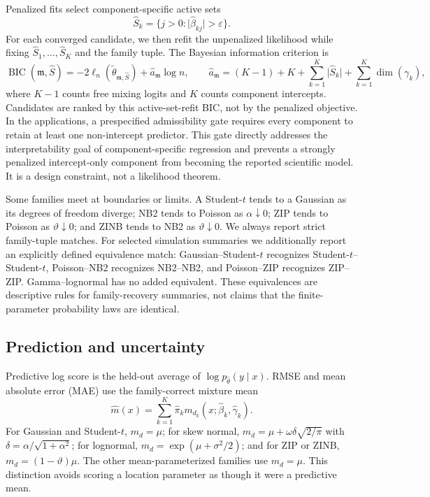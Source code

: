 \documentclass[a4paper,fleqn]{cas-sc}
\newcommand{\model}{\mathfrak m}
\begin{document}
Penalized fits select component-specific active sets
\[
  \widehat S_k=\{j>0:\lvert\widehat\beta_{kj}\rvert>\varepsilon\}.
\]
For each converged candidate, we then refit the unpenalized likelihood while fixing $\widehat S_1,\ldots,\widehat S_K$ and the family tuple. The Bayesian information criterion is
\begin{equation}
  \operatorname{BIC}(\model,\widehat S)
  =-2\ell_n(\widetilde\theta_{\model,\widehat S})+\widehat a_{\model}\log n,
  \qquad
  \widehat a_{\model}=(K-1)+K+\sum_{k=1}^K\lvert\widehat S_k\rvert+
  \sum_{k=1}^K\dim(\gamma_k),
  \label{eq:bic}
\end{equation}
where $K-1$ counts free mixing logits and $K$ counts component intercepts. Candidates are ranked by this active-set-refit BIC, not by the penalized objective. In the applications, a prespecified admissibility gate requires every component to retain at least one non-intercept predictor. This gate directly addresses the interpretability goal of component-specific regression and prevents a strongly penalized intercept-only component from becoming the reported scientific model. It is a design constraint, not a likelihood theorem.

Some families meet at boundaries or limits. A Student-$t$ tends to a Gaussian as its degrees of freedom diverge; NB2 tends to Poisson as $\alpha\downarrow0$; ZIP tends to Poisson as $\vartheta\downarrow0$; and ZINB tends to NB2 as $\vartheta\downarrow0$. We always report strict family-tuple matches. For selected simulation summaries we additionally report an explicitly defined equivalence match: Gaussian--Student-$t$ recognizes Student-$t$--Student-$t$, Poisson--NB2 recognizes NB2--NB2, and Poisson--ZIP recognizes ZIP--ZIP. Gamma--lognormal has no added equivalent. These equivalences are descriptive rules for family-recovery summaries, not claims that the finite-parameter probability laws are identical.

\subsection{Prediction and uncertainty}
\label{sec:inference-workflow}

Predictive log score is the held-out average of $\log p_{\widehat\theta}(y\mid x)$. RMSE and mean absolute error (MAE) use the family-correct mixture mean
\[
  \widehat m(x)=\sum_{k=1}^K\widehat\pi_k m_{d_k}(x;\widehat\beta_k,\widehat\gamma_k).
\]
For Gaussian and Student-$t$, $m_d=\mu$; for skew normal, $m_d=\mu+\omega\delta\sqrt{2/\pi}$ with $\delta=\alpha/\sqrt{1+\alpha^2}$; for lognormal, $m_d=\exp(\mu+\sigma^2/2)$; and for ZIP or ZINB, $m_d=(1-\vartheta)\mu$. The other mean-parameterized families use $m_d=\mu$. This distinction avoids scoring a location parameter as though it were a predictive mean.
\end{document}
